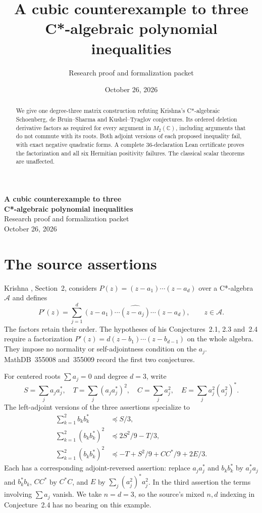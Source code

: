 \documentclass[11pt]{article}
\title{A cubic counterexample to three\\C*-algebraic polynomial inequalities}
\author{Research proof and formalization packet}
\date{October 26, 2026}
\begin{document}
\begin{center}
{\Large\bfseries A cubic counterexample to three\\
C*-algebraic polynomial inequalities}\\[.5em]
Research proof and formalization packet\\
October 26, 2026
\end{center}
\begin{abstract}
We give one degree-three matrix construction refuting Krishna's
C*-algebraic Schoenberg, de Bruin--Sharma and Kushel--Tyaglov
conjectures. Its ordered deletion derivative factors as required for
every argument in $M_2(\mathbb C)$, including arguments that do not
commute with its roots. Both adjoint versions of each proposed
inequality fail, with exact negative quadratic forms. A complete
36-declaration Lean certificate proves the factorization and all six
Hermitian positivity failures. The classical scalar theorems are
unaffected.
\end{abstract}

\section{The source assertions}
Krishna \cite{K}, Section~2, considers
$P(z)=(z-a_1)\cdots(z-a_d)$ over a C*-algebra $\mathcal A$ and defines
\[
 P'(z)=\sum_{j=1}^d(z-a_1)\cdots\widehat{(z-a_j)}\cdots(z-a_d),
 \qquad z\in\mathcal A.
\]
The factors retain their order. The hypotheses of his Conjectures~2.1,
2.3 and~2.4 require a factorization
$P'(z)=d(z-b_1)\cdots(z-b_{d-1})$ on the whole algebra.
They impose no normality or self-adjointness condition on the $a_j$.
MathDB~355008 and~355009 record the first two conjectures.

For centered roots $\sum a_j=0$ and degree $d=3$, write
\[
 S=\sum_j a_ja_j^*,\quad T=\sum_j(a_ja_j^*)^2,\quad
 C=\sum_j a_j^2,\quad E=\sum_j a_j^2(a_j^2)^*.
\]
The left-adjoint versions of the three assertions specialize to
\begin{align}
 \sum_{k=1}^2 b_kb_k^*&\preceq S/3,\label{S}\\
 \sum_{k=1}^2(b_kb_k^*)^2&\preceq 2S^2/9-T/3,\label{D}\\
 \sum_{k=1}^2(b_kb_k^*)^2&\preceq -T+S^2/9+CC^*/9+2E/3.\label{KT}
\end{align}
Each has a corresponding adjoint-reversed assertion: replace
$a_ja_j^*$ and $b_kb_k^*$ by $a_j^*a_j$ and $b_k^*b_k$,
$CC^*$ by $C^*C$, and $E$ by $\sum_j(a_j^2)^*a_j^2$.
In the third assertion the terms involving $\sum a_j$ vanish.
We take $n=d=3$, so the source's mixed $n,d$ indexing in
Conjecture~2.4 has no bearing on this example.
\end{document}
